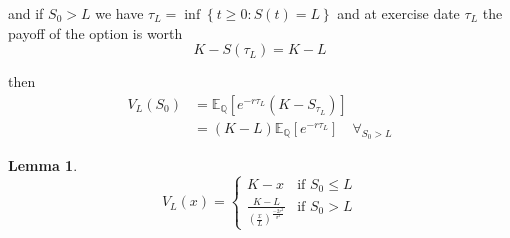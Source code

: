 \documentclass[12pt]{article}
\newtheorem{lemma}{Lemma}
\newcommand{\Q}{\mathbb Q}
\newcommand{\E}{\mathbb E}
\begin{document}
and if $S_0 > L$ we have $\tau_L = \inf \left\{ t \geq 0 : S(t) = L \right\}$ and at exercise date $\tau_L$ the payoff of the option is worth
\begin{equation*}
	K - S(\tau_L) = K - L
\end{equation*}

then
\begin{align*}
	V_L(S_0) &= \E_\Q \left[ e^{-r\tau_L} \left( K - S_{\tau_L} \right) \right] \\
	&= (K - L) \E_\Q \left[e^{-r \tau_L} \right] \quad \forall_{S_0 > L}
\end{align*}

\begin{lemma}
\begin{equation*}
	V_L(x) =
	\begin{cases}
		K - x & \text{if } S_0 \leq L \\
		\frac{K - L}{ \left(\frac{x}{L}\right)^\frac{-2r^2}{\sigma^2} } & \text{if } S_0 > L
	\end{cases}
\end{equation*}
\end{lemma}
\end{document}
